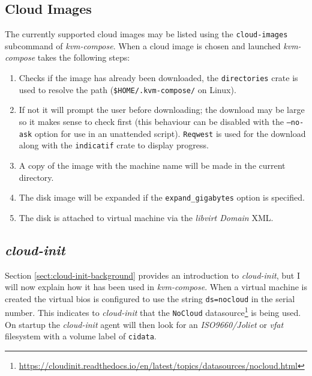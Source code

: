 \documentclass[
    author={Jacob Daniel Halsey},
    supervisor={Prof. Awais Rashid},
    degree={BSc},
    title={Building a Testbed for Evaluating Privacy Enhancing Technologies  (PETs)},
    subtitle={},
    type={software development},
    year={2021}
]{dissertation}
\begin{document}
\subsection{Cloud Images}

The currently supported cloud images may be listed using the \texttt{cloud-images} subcommand 
of \emph{kvm-compose}. When a cloud image is chosen and launched \emph{kvm-compose} takes the following
steps:

\begin{singlespace}
	\begin{enumerate}
		\item Checks if the image has already been downloaded, the \texttt{directories} crate 
		is used to resolve the path (\texttt{\$HOME/.kvm-compose/} on Linux).
		\item If not it will prompt the user before downloading; the download may be large so it makes sense
		to check first (this behaviour can be disabled with the \texttt{--no-ask} option for use in
		an unattended script). \texttt{Reqwest} is used for the download along with the \texttt{indicatif}
		crate to display progress.
		\item A copy of the image with the machine name will be made in the current directory.
		\item The disk image will be expanded if the \texttt{expand\_gigabytes} option is specified.
		\item The disk is attached to virtual machine via the \emph{libvirt Domain} XML.
	\end{enumerate}
\end{singlespace}

\subsection{\emph{cloud-init}}

Section \ref{sect:cloud-init-background} provides an introduction to \emph{cloud-init}, but I
will now explain how it has been used in \emph{kvm-compose}.
When a virtual machine is created the virtual bios is configured to use the string
\texttt{ds=nocloud} in the serial number. This indicates to \emph{cloud-init} that 
the \texttt{NoCloud} datasource\footnote{\url{https://cloudinit.readthedocs.io/en/latest/topics/datasources/nocloud.html}}
is being used. On startup the \emph{cloud-init} agent will then look for an \emph{ISO9660/Joliet} or \emph{vfat}
filesystem with a volume label of \texttt{cidata}. \\
\end{document}
